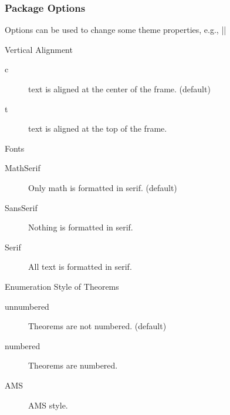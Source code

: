 \documentclass[9pt]{beamer}
\begin{document}
\begin{frame}
  \frametitle{Package Options}

  Options can be used to change some theme properties, e.g.,
  ||

  \begin{block}{Vertical Alignment}
    \begin{description}
      \item[c] text is aligned at the center of the frame. (default)
      \item[t] text is aligned at the top of the frame.
    \end{description}
  \end{block}

  \begin{block}{Fonts}
    \begin{description}
      \item[MathSerif]  Only math is formatted in serif. (default)
      \item[SansSerif]  Nothing is formatted in serif.
      \item[Serif]  All text is formatted in serif.
    \end{description}
  \end{block}

  \begin{block}{Enumeration Style of Theorems}
    \begin{description}
      \item[unnumbered]  Theorems are not numbered. (default)
      \item[numbered]  Theorems are numbered.
      \item[AMS]  AMS style.
    \end{description}
  \end{block}

\end{frame}

\showlogo
\end{document}
